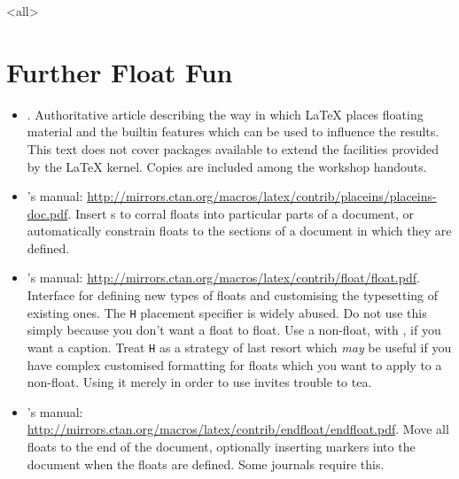 \mode<all>
\mode*


\appendix


\section<1-| beamer:0>{Further Float Fun}\label{sec:fff}

\begin{itemize}
  \item {}.
  Authoritative article describing the way in which \LaTeX{} places floating material and the builtin features which can be used to influence the results.
  This text does not cover packages available to extend the facilities provided by the \LaTeX{} kernel.
  Copies are included among the workshop handouts.
  \item {}'s manual: \url{http://mirrors.ctan.org/macros/latex/contrib/placeins/placeins-doc.pdf}.
  Insert s to corral floats into particular parts of a document, or automatically constrain floats to the sections of a document in which they are defined.
  \item {}'s manual: \url{http://mirrors.ctan.org/macros/latex/contrib/float/float.pdf}.
  Interface for defining new types of floats and customising the typesetting of existing ones.
  The \verb|H| placement specifier is widely abused.
  Do not use this simply because you don't want a float to float.
  Use a non-float, with , if you want a caption.
  Treat \verb|H| as a strategy of last resort which \emph{may} be useful if you have complex customised formatting for floats which you want to apply to a non-float.
  Using it merely in order to use  invites trouble to tea.
  \item {}'s manual: \url{http://mirrors.ctan.org/macros/latex/contrib/endfloat/endfloat.pdf}.
  Move all floats to the end of the document, optionally inserting markers into the document when the floats are defined.
  Some journals require this.
\end{itemize}

